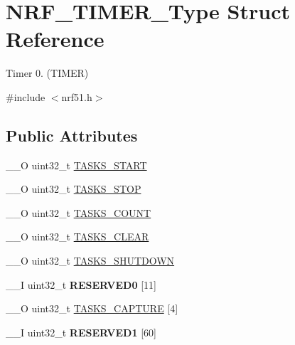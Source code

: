 \hypertarget{struct_n_r_f___t_i_m_e_r___type}{}\section{N\+R\+F\+\_\+\+T\+I\+M\+E\+R\+\_\+\+Type Struct Reference}
\label{struct_n_r_f___t_i_m_e_r___type}


Timer 0. (T\+I\+M\+E\+R)  




{\ttfamily \#include $<$nrf51.\+h$>$}

\subsection*{Public Attributes}
\begin{DoxyCompactItemize}
\item 
\+\_\+\+\_\+\+O uint32\+\_\+t \hyperlink{struct_n_r_f___t_i_m_e_r___type_ad89116b4de09e7d921ddd956531165fb}{T\+A\+S\+K\+S\+\_\+\+S\+T\+A\+R\+T}
\item 
\+\_\+\+\_\+\+O uint32\+\_\+t \hyperlink{struct_n_r_f___t_i_m_e_r___type_ab31e11c24380e62885a668e9972c778d}{T\+A\+S\+K\+S\+\_\+\+S\+T\+O\+P}
\item 
\+\_\+\+\_\+\+O uint32\+\_\+t \hyperlink{struct_n_r_f___t_i_m_e_r___type_a144f0bdb8c87c871c3c97f947a6cb4ae}{T\+A\+S\+K\+S\+\_\+\+C\+O\+U\+N\+T}
\item 
\+\_\+\+\_\+\+O uint32\+\_\+t \hyperlink{struct_n_r_f___t_i_m_e_r___type_aa9746dc5b1a1675a03232b5c79574490}{T\+A\+S\+K\+S\+\_\+\+C\+L\+E\+A\+R}
\item 
\+\_\+\+\_\+\+O uint32\+\_\+t \hyperlink{struct_n_r_f___t_i_m_e_r___type_a506d472f5660cb9721f4ceccfc7ecbf2}{T\+A\+S\+K\+S\+\_\+\+S\+H\+U\+T\+D\+O\+W\+N}
\item 
\hypertarget{struct_n_r_f___t_i_m_e_r___type_ac6212cc1d11b84789c436547b1e296af}{}\+\_\+\+\_\+\+I uint32\+\_\+t {\bfseries R\+E\+S\+E\+R\+V\+E\+D0} \mbox{[}11\mbox{]}\label{struct_n_r_f___t_i_m_e_r___type_ac6212cc1d11b84789c436547b1e296af}

\item 
\+\_\+\+\_\+\+O uint32\+\_\+t \hyperlink{struct_n_r_f___t_i_m_e_r___type_a4b97b7cd56a74f310e831fb470da2b73}{T\+A\+S\+K\+S\+\_\+\+C\+A\+P\+T\+U\+R\+E} \mbox{[}4\mbox{]}
\item 
\hypertarget{struct_n_r_f___t_i_m_e_r___type_ac5221bb13ac935a3b32cd15b1ee3d6b2}{}\+\_\+\+\_\+\+I uint32\+\_\+t {\bfseries R\+E\+S\+E\+R\+V\+E\+D1} \mbox{[}60\mbox{]}\label{struct_n_r_f___t_i_m_e_r___type_ac5221bb13ac935a3b32cd15b1ee3d6b2}


\end{DoxyCompactItemize}
